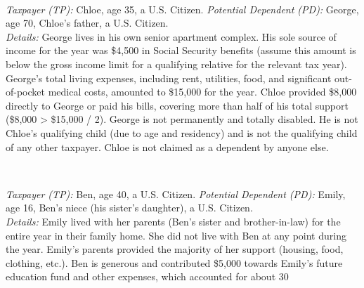 \documentclass[11pt, letterpaper]{article}
\begin{document}
\begin{description}[style=unboxed, leftmargin=0pt]
    \item[Scenario D3 (Dependent - QR, Parent, Low Income)] \mbox{} \\ \begin{RaggedRight}
    \textit{Taxpayer (TP):} Chloe, age 35, a U.S. Citizen.
    \textit{Potential Dependent (PD):} George, age 70, Chloe's father, a U.S. Citizen. \\
    \textit{Details:} George lives in his own senior apartment complex. His sole source of income for the year was \$4,500 in Social Security benefits (assume this amount is below the gross income limit for a qualifying relative for the relevant tax year). George's total living expenses, including rent, utilities, food, and significant out-of-pocket medical costs, amounted to \$15,000 for the year. Chloe provided \$8,000 directly to George or paid his bills, covering more than half of his total support (\$8,000 > \$15,000 / 2). George is not permanently and totally disabled. He is not Chloe's qualifying child (due to age and residency) and is not the qualifying child of any other taxpayer. Chloe is not claimed as a dependent by anyone else.
    \end{RaggedRight}

    \item[Scenario ND1 (Non-Dependent - Fails QC Residency, Fails QR Income)] \mbox{} \\ \begin{RaggedRight}
    \textit{Taxpayer (TP):} Ben, age 40, a U.S. Citizen.
    \textit{Potential Dependent (PD):} Emily, age 16, Ben's niece (his sister's daughter), a U.S. Citizen. \\
    \textit{Details:} Emily lived with her parents (Ben's sister and brother-in-law) for the entire year in their family home. She did not live with Ben at any point during the year. Emily's parents provided the majority of her support (housing, food, clothing, etc.). Ben is generous and contributed \$5,000 towards Emily's future education fund and other expenses, which accounted for about 30%
    \end{RaggedRight}


\end{description}
\end{document}
